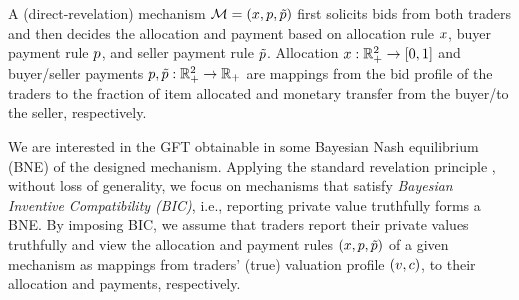 A (direct-revelation) mechanism $\mathcal{M} = (x,p, \tilde{p})$ first solicits bids from both traders and then decides the allocation and payment based on allocation rule $x$, buyer payment rule $p$, and seller payment rule $\tilde{p}$. Allocation $x:\mathbb{R}_+^2\rightarrow [0, 1]$ and buyer/seller payments $p,\tilde{p}:\mathbb{R}_+^{2}\rightarrow\mathbb{R}_+$ are mappings from the bid profile of the traders to the fraction of item allocated and monetary transfer from the buyer/to the seller, respectively. 

We are interested in the GFT obtainable in some Bayesian Nash equilibrium (BNE) of the designed mechanism. Applying the standard revelation principle \citep{mye-81}, without loss of generality, we focus on mechanisms that satisfy \emph{Bayesian Inventive Compatibility (BIC)}, i.e., reporting private value truthfully forms a BNE. By imposing BIC, we assume that traders report their private values truthfully and view the allocation and payment rules $(x, p, \tilde{p})$ of a given mechanism as mappings from traders' (true) valuation profile $(v, c)$, to their allocation and payments, respectively. 

